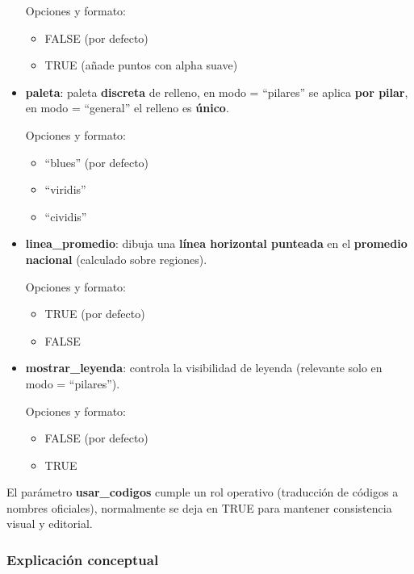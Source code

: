 \documentclass[
  11pt,
  letterpaper,
  DIV=11,
  numbers=noendperiod]{scrartcl}
\begin{document}
\begin{itemize}
  Opciones y formato:

  \begin{itemize}
  \item
    FALSE (por defecto)
  \item
    TRUE (añade puntos con alpha suave)
  \end{itemize}
\item
  \textbf{paleta}: paleta \textbf{discreta} de relleno, en modo =
  ``pilares'' se aplica \textbf{por pilar}, en modo = ``general'' el
  relleno es \textbf{único}.

  Opciones y formato:

  \begin{itemize}
  \item
    ``blues'' (por defecto)
  \item
    ``viridis''
  \item
    ``cividis''
  \end{itemize}
\item
  \textbf{linea\_promedio}: dibuja una \textbf{línea horizontal
  punteada} en el \textbf{promedio nacional} (calculado sobre regiones).

  Opciones y formato:

  \begin{itemize}
  \item
    TRUE (por defecto)
  \item
    FALSE
  \end{itemize}
\item
  \textbf{mostrar\_leyenda}: controla la visibilidad de leyenda
  (relevante solo en modo = ``pilares'').

  Opciones y formato:

  \begin{itemize}
  \item
    FALSE (por defecto)
  \item
    TRUE
  \end{itemize}
\end{itemize}

El parámetro \textbf{usar\_codigos} cumple un rol operativo (traducción
de códigos a nombres oficiales), normalmente se deja en TRUE para
mantener consistencia visual y editorial.

\subsubsection{\texorpdfstring{\textbf{Explicación
conceptual}}{Explicación conceptual}}\label{explicaciuxf3n-conceptual-3}
\end{document}
